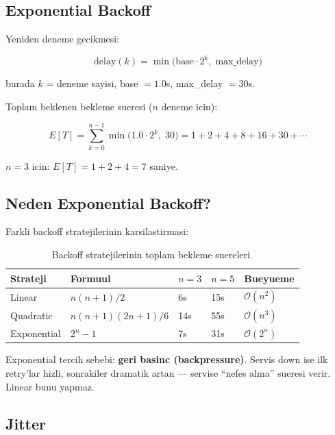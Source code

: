 \documentclass[12pt,a4paper,oneside]{book}
\theoremstyle{definition}
\newcommand{\bigO}[1]{\mathcal{O}\!\left(#1\right)}
\begin{document}
\subsection{Exponential Backoff}

Yeniden deneme gecikmesi:

\begin{equation}
\text{delay}(k) = \min\!\big(\text{base} \cdot 2^k,\; \text{max\_delay}\big)
\label{eq:backoff}
\end{equation}

burada $k$ = deneme sayisi, base $= 1.0$s, max\_delay $= 30$s.

Toplam beklenen bekleme sueresi ($n$ deneme icin):

\begin{equation}
E[T] = \sum_{k=0}^{n-1} \min\!\big(1.0 \cdot 2^k,\; 30\big) = 1 + 2 + 4 + 8 + 16 + 30 + \cdots
\end{equation}

$n = 3$ icin: $E[T] = 1 + 2 + 4 = 7$ saniye.

\subsection{Neden Exponential Backoff?}

Farkli backoff stratejilerinin karsilastirmasi:

\begin{table}[ht]
\centering
\begin{tabular}{lllll}
\toprule
\textbf{\color{sectioncyan}Strateji} & \textbf{\color{sectioncyan}Formuul} & \textbf{\color{sectioncyan}$n=3$} & \textbf{\color{sectioncyan}$n=5$} & \textbf{\color{sectioncyan}Bueyueme} \\
\midrule
Linear & $n(n+1)/2$ & 6s & 15s & $\bigO{n^2}$ \\
Quadratic & $n(n+1)(2n+1)/6$ & 14s & 55s & $\bigO{n^3}$ \\
Exponential & $2^n - 1$ & 7s & 31s & $\bigO{2^n}$ \\
\bottomrule
\end{tabular}
\caption{Backoff stratejilerinin toplam bekleme suereleri.}
\end{table}

Exponential tercih sebebi: \textbf{geri basinc (backpressure)}. Servis down ise ilk retry'lar hizli, sonrakiler dramatik artan --- servise ``nefes alma'' sueresi verir. Linear bunu yapmaz.

\subsection{Jitter}
\end{document}
